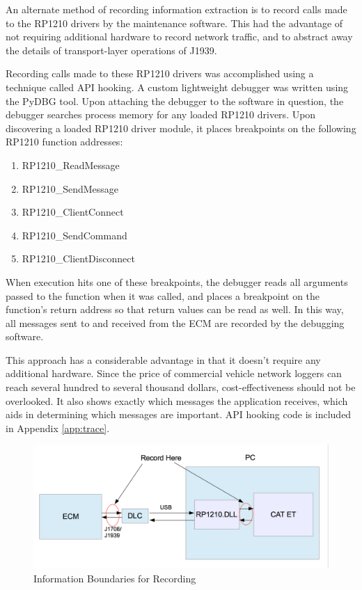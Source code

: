 An alternate method of recording information extraction is to record calls made to the RP1210 drivers
by the maintenance software. This had the advantage of not requiring additional hardware to 
record network traffic, and to abstract away the details of transport-layer operations of J1939.

Recording calls made to these RP1210 drivers was accomplished using a technique called API hooking\cite{Berdajs2010}.
A custom lightweight debugger was written using the PyDBG tool. Upon attaching the debugger to the software
in question, the debugger searches process memory for any loaded RP1210 drivers. Upon discovering a loaded RP1210
driver module, it places breakpoints on the following RP1210 function addresses:

\begin{enumerate}
  \item RP1210\_ReadMessage
  \item RP1210\_SendMessage
  \item RP1210\_ClientConnect
  \item RP1210\_SendCommand
  \item RP1210\_ClientDisconnect
\end{enumerate}

When execution hits one of these breakpoints, the debugger reads all arguments passed to the function when it was called,
and places a breakpoint on the function's return address so that return values can be read as well. In this way, all
messages sent to and received from the ECM are recorded by the debugging software.

This approach has a considerable advantage in that it doesn't require any additional hardware. Since the price of 
commercial vehicle network loggers can reach several hundred to several thousand dollars, cost-effectiveness should
not be overlooked. It also shows exactly which messages the application receives, which aids in determining which
messages are important. API hooking code is included in Appendix \ref{app:trace}.

\begin{figure}[h]
  \centering
  \includegraphics[scale=0.5]{RecordPoint}
  \caption{Information Boundaries for Recording}
  \label{fig:infoboundaries}
\end{figure}

